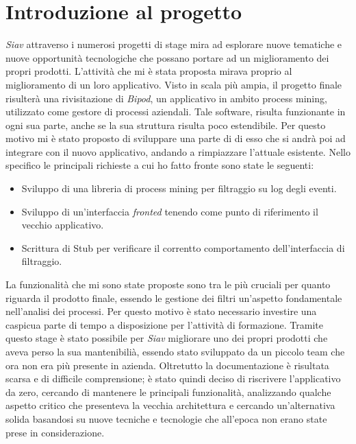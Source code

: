 \section{Introduzione al progetto}
\textit{Siav} attraverso i numerosi progetti di stage mira ad esplorare nuove tematiche e nuove opportunità tecnologiche che possano portare ad un miglioramento dei propri prodotti. L'attività che mi è stata proposta mirava proprio al miglioramento di un loro applicativo. Visto in scala più ampia, il progetto finale risulterà una rivisitazione di \textit{Bipod}, un applicativo in ambito process mining, utilizzato come gestore di processi aziendali.
Tale software, risulta funzionante in ogni sua parte, anche se la sua struttura risulta poco estendibile. Per questo motivo mi è stato proposto di sviluppare una parte di di esso che si andrà poi ad integrare con il nuovo applicativo, andando a rimpiazzare l'attuale esistente.
Nello specifico le principali richieste a cui ho fatto fronte sono state le seguenti:
\begin{itemize}
	\item Sviluppo di una libreria di process mining per filtraggio su log degli eventi.
	\item Sviluppo di un'interfaccia \textit{fronted} tenendo come punto di riferimento il vecchio applicativo.
	\item Scrittura di Stub per verificare il correntto comportamento dell'interfaccia di filtraggio.
\end{itemize}
La funzionalità che mi sono state proposte sono tra le più cruciali per quanto riguarda il prodotto finale, essendo le gestione dei filtri un'aspetto fondamentale nell'analisi dei processi. Per questo motivo è stato necessario investire una caspicua parte di tempo a disposizione per l'attività di formazione.
Tramite questo stage è stato possibile per \textit{Siav} migliorare uno dei propri prodotti che aveva perso la sua mantenibilià, essendo stato sviluppato da un piccolo team che ora non era più presente in azienda. Oltretutto la documentazione è risultata scarsa e di difficile comprensione; è stato quindi deciso di riscrivere l'applicativo da zero, cercando di mantenere le principali funzionalità, analizzando qualche aspetto critico che presenteva la vecchia architettura e cercando un'alternativa solida basandosi su nuove tecniche e tecnologie che all'epoca non erano state prese in considerazione. 

